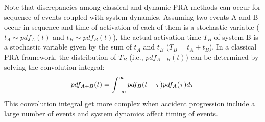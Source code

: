Note that discrepancies among classical and dynamic PRA methods can occur for sequence of 
events coupled with system dynamics.
Assuming two events A and B occur in sequence and time of activation of each of them is a stochastic variable 
($t_A \sim pdf_A(t)$ and $t_B \sim pdf_B(t)$), the actual activation time $T_B$ of system B is a stochastic 
variable given by the sum of $t_A$ and $t_B$ ($T_B = t_A + t_B$). 
In a classical PRA framework, the distribution of $T_B$ (i.e., $pdf_{A+B}(t)$) can be 
determined by solving the convolution integral:   
\begin{equation}
  pdf_{A+B}(t) = \int_{-\infty}^{\infty} pdf_B(t-\tau) pdf_A(\tau) d\tau
  \label{eq:pdf_{A+B}}
\end{equation}
This convolution integral get more complex when accident progression include a large number of events and 
system dynamics affect timing of events.




